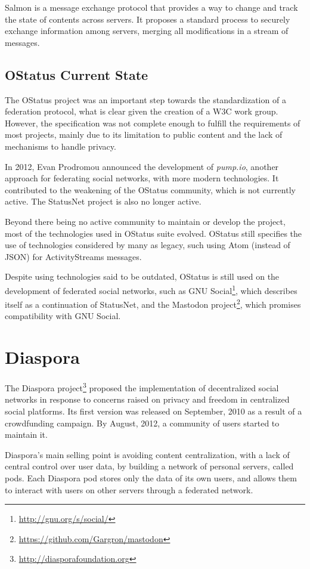 Salmon is a message exchange protocol that provides a way to change and
track the state of contents across servers. It proposes a standard
process to securely exchange information among servers, merging
all modifications in a stream of messages.

\subsection{OStatus Current State}

The OStatus project was an important step towards the standardization of
a federation protocol, what is clear given the creation of a W3C work
group.  However, the specification was not complete enough to fulfill
the requirements of most projects, mainly due to its limitation to
public content and the lack of mechanisms to handle privacy.

In 2012, Evan Prodromou announced the development of \textit{pump.io},
another approach for federating social networks, with more modern
technologies. It contributed to the weakening of the OStatus community,
which is not currently active. The StatusNet project is also no longer
active.

Beyond there being no active community to maintain or develop the
project, most of the technologies used in OStatus suite evolved. OStatus
still specifies the use of technologies considered by many as legacy,
such using Atom (instead of JSON) for ActivityStreams messages.

Despite using technologies said to be outdated, OStatus is still used on the
development of federated social networks, such as GNU
Social\footnote{\url{http://gnu.org/s/social/}}, which describes itself
as a continuation of StatusNet, and the Mastodon
project\footnote{\url{https://github.com/Gargron/mastodon}}, which promises
compatibility with GNU Social.

\section{Diaspora}

The Diaspora project\footnote{\url{http://diasporafoundation.org}} proposed the
implementation of decentralized social networks in response to concerns raised
on privacy and freedom in centralized social platforms. Its first version was
released on September, 2010 as a result of a crowdfunding campaign. By August,
2012, a community of users started to maintain it.

Diaspora's main selling point is avoiding content centralization, with a lack of
central control over user data, by building a network of personal servers,
called pods. Each Diaspora pod stores only the data of its own users, and
allows them to interact with users on other servers through a federated
network.

